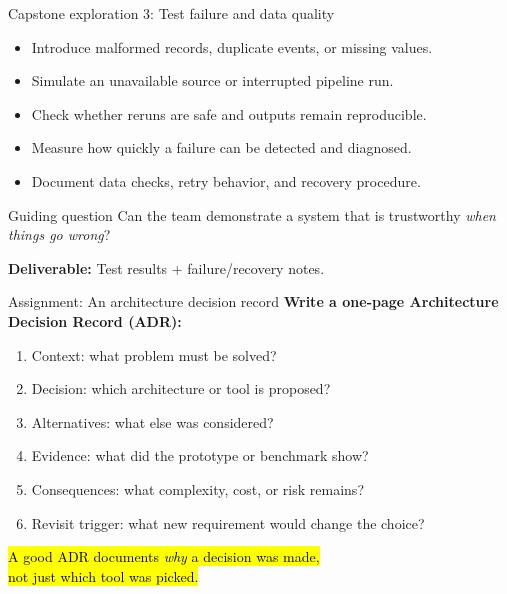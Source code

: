 \documentclass[aspectratio=43,10pt]{beamer}
\begin{document}
\begin{frame}{Capstone exploration 3: Test failure and data quality}
\begin{itemize}
  \item Introduce malformed records, duplicate events, or missing values.
  \item Simulate an unavailable source or interrupted pipeline run.
  \item Check whether reruns are safe and outputs remain reproducible.
  \item Measure how quickly a failure can be detected and diagnosed.
  \item Document data checks, retry behavior, and recovery procedure.
\end{itemize}

\medskip
\begin{alertblock}{Guiding question}
Can the team demonstrate a system that is trustworthy \emph{when things go wrong}?
\end{alertblock}
\textbf{Deliverable:} Test results + failure/recovery notes.
\end{frame}

\begin{frame}{Assignment: An architecture decision record}
\textbf{Write a one-page Architecture Decision Record (ADR):}
\begin{enumerate}
  \item Context: what problem must be solved?
  \item Decision: which architecture or tool is proposed?
  \item Alternatives: what else was considered?
  \item Evidence: what did the prototype or benchmark show?
  \item Consequences: what complexity, cost, or risk remains?
  \item Revisit trigger: what new requirement would change the choice?
\end{enumerate}
\vspace{0.4em}
\small \hl{A good ADR documents \emph{why} a decision was made,\\not just which tool was picked.}
\end{frame}
\end{document}
